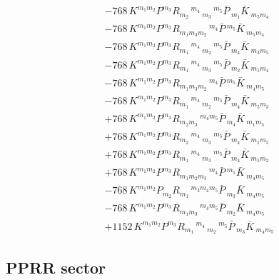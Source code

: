 \begin{align}
&-768\,K^{{m_{1}} {m_{2}}} P^{{m_{3}}} R_{{m_{2}}}\,^{{m_{4}}}\,_{{m_{3}}}\,^{{m_{5}}} \bar{P}\,_{{m_{1}}} \bar{K}\,_{{m_{5}} {m_{4}}}\\
&-768\,K^{{m_{1}} {m_{2}}} P^{{m_{3}}} R_{{m_{1}} {m_{3}} {m_{2}}}\,^{{m_{4}}} \bar{P}\,^{{m_{5}}} \bar{K}\,_{{m_{5}} {m_{4}}}\\
&-768\,K^{{m_{1}} {m_{2}}} P^{{m_{3}}} R_{{m_{1}}}\,^{{m_{4}}}\,_{{m_{2}}}\,^{{m_{5}}} \bar{P}\,_{{m_{4}}} \bar{K}\,_{{m_{3}} {m_{5}}}\\
&-768\,K^{{m_{1}} {m_{2}}} P^{{m_{3}}} R_{{m_{1}}}\,^{{m_{4}}}\,_{{m_{3}}}\,^{{m_{5}}} \bar{P}\,_{{m_{2}}} \bar{K}\,_{{m_{5}} {m_{4}}}\\
&-768\,K^{{m_{1}} {m_{2}}} P^{{m_{3}}} R_{{m_{1}} {m_{3}} {m_{2}}}\,^{{m_{4}}} \bar{P}\,^{{m_{5}}} \bar{K}\,_{{m_{4}} {m_{5}}}\\
&-768\,K^{{m_{1}} {m_{2}}} P^{{m_{3}}} R_{{m_{1}}}\,^{{m_{4}}}\,_{{m_{2}}}\,^{{m_{5}}} \bar{P}\,_{{m_{4}}} \bar{K}\,_{{m_{5}} {m_{3}}}\\
&+768\,K^{{m_{1}} {m_{2}}} P^{{m_{3}}} R_{{m_{2}} {m_{3}}}\,^{{m_{4}} {m_{5}}} \bar{P}\,_{{m_{4}}} \bar{K}\,_{{m_{1}} {m_{5}}}\\
&+768\,K^{{m_{1}} {m_{2}}} P^{{m_{3}}} R_{{m_{2}}}\,^{{m_{4}}}\,_{{m_{3}}}\,^{{m_{5}}} \bar{P}\,_{{m_{4}}} \bar{K}\,_{{m_{1}} {m_{5}}}\\
&+768\,K^{{m_{1}} {m_{2}}} P^{{m_{3}}} R_{{m_{1}}}\,^{{m_{4}}}\,_{{m_{3}}}\,^{{m_{5}}} \bar{P}\,_{{m_{4}}} \bar{K}\,_{{m_{5}} {m_{2}}}\\
&+768\,K^{{m_{1}} {m_{2}}} P^{{m_{3}}} R_{{m_{1}} {m_{2}} {m_{3}}}\,^{{m_{4}}} \bar{P}\,^{{m_{5}}} \bar{K}\,_{{m_{4}} {m_{5}}}\\
&-768\,K^{{m_{1}} {m_{2}}} P_{{m_{2}}} R_{{m_{1}}}\,^{{m_{3}} {m_{4}} {m_{5}}} \bar{P}\,_{{m_{3}}} \bar{K}\,_{{m_{4}} {m_{5}}}\\
&-768\,K^{{m_{1}} {m_{2}}} P^{{m_{3}}} R_{{m_{1}} {m_{3}}}\,^{{m_{4}} {m_{5}}} \bar{P}\,_{{m_{2}}} \bar{K}\,_{{m_{4}} {m_{5}}}\\
&+1152\,K^{{m_{1}} {m_{2}}} P^{{m_{3}}} R_{{m_{1}}}\,^{{m_{4}}}\,_{{m_{2}}}\,^{{m_{5}}} \bar{P}\,_{{m_{3}}} \bar{K}\,_{{m_{4}} {m_{5}}}
\end{align}

\subsection{PPRR sector}

